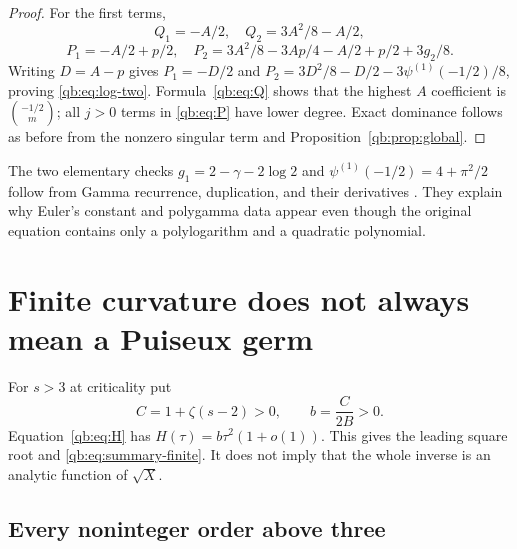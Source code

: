 \documentclass[11pt,a4paper]{article}
\theoremstyle{definition}\newtheorem{definition}[theorem]{Definition}
\theoremstyle{remark}\newtheorem{remark}[theorem]{Remark}
\numberwithin{equation}{section}
\begin{document}
\begin{proof}
For the first terms,
\[
 Q_1=-A/2,\quad Q_2=3A^2/8-A/2,
\]
\[
 P_1=-A/2+p/2,\quad
 P_2=3A^2/8-3Ap/4-A/2+p/2+3g_2/8.
\]
Writing $D=A-p$ gives
$P_1=-D/2$ and
$P_2=3D^2/8-D/2-3\psi^{(1)}(-1/2)/8$, proving
\eqref{qb:eq:log-two}. Formula~\eqref{qb:eq:Q} shows that the highest
$A$ coefficient is $\binom{-1/2}{m}$; all $j>0$ terms in
\eqref{qb:eq:P} have lower degree. Exact dominance follows as before
from the nonzero singular term and Proposition~\ref{qb:prop:global}.
\end{proof}

The two elementary checks $g_1=2-\gamma-2\log2$ and
$\psi^{(1)}(-1/2)=4+\pi^2/2$ follow from Gamma recurrence, duplication,
and their derivatives \cite{dlmfgamma}. They explain why Euler's constant
and polygamma data appear even though the original equation contains only
a polylogarithm and a quadratic polynomial.

\section{Finite curvature does not always mean a Puiseux germ}
\label{qb:sec:finite}

For $s>3$ at criticality put
\begin{equation}\label{qb:eq:curvature}
 C=1+\zeta(s-2)>0,\qquad b=\frac{C}{2B}>0.
\end{equation}
Equation~\eqref{qb:eq:H} has $H(\tau)=b\tau^2(1+o(1))$.
This gives the leading square root and
\eqref{qb:eq:summary-finite}. It does not imply that the whole inverse is
an analytic function of $\sqrt X$.

\subsection{Every noninteger order above three}
\end{document}
